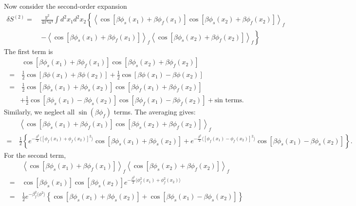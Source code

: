 \documentclass{SciPost}
\begin{document}
Now consider the second-order expansion
\begin{equation*}
\begin{aligned}
	\delta S^{(2)} 
	=&\ \frac{y^2}{4\pi^4 a^4} \int d^2 x_1 d^2 x_2 \left\{ \left\langle \cos\left[\beta\phi_s(x_1)+\beta\phi_f(x_1)\right] \cos\left[\beta\phi_s(x_2)+\beta\phi_f(x_2)\right] \right\rangle_f \right. \\
	&\ \left. -\left\langle \cos\left[\beta\phi_s(x_1)+\beta\phi_f(x_1)\right]\right\rangle_f \left\langle \cos\left[\beta\phi_s(x_2)+\beta\phi_f(x_2)\right]\right\rangle_f \right\}
\end{aligned}
\end{equation*}
The first term is 
\begin{equation*}
\begin{aligned}
	&\  \cos\left[\beta\phi_s(x_1)+\beta\phi_f(x_1)\right] 
		\cos\left[\beta\phi_s(x_2)+\beta\phi_f(x_2)\right] \\
	=&\ \frac{1}{2}\cos\left[\beta\phi(x_1)+\beta\phi(x_2)\right] + 
	  \frac{1}{2}\cos\left[\beta\phi(x_1)-\beta\phi(x_2)\right] \\
	=&\ \frac{1}{2}\cos\left[\beta\phi_s(x_1)+\beta\phi_s(x_2)\right] \cos\left[\beta\phi_f(x_1)+\beta\phi_f(x_2)\right] \\
	&+ \frac{1}{2} \cos\left[\beta\phi_s(x_1)-\beta\phi_s(x_2)\right] \cos\left[\beta\phi_f(x_1)-\beta\phi_f(x_2)\right]  + \text{sin terms}.
\end{aligned}
\end{equation*}
Similarly, we neglect all $\sin(\beta\phi_f)$ terms.
The averaging gives:
\begin{equation*}
\begin{aligned}
	&\  \left\langle\cos\left[\beta\phi_s(x_1)+\beta\phi_f(x_1)\right] 
		\cos\left[\beta\phi_s(x_2)+\beta\phi_f(x_2)\right]\right\rangle_f \\
	=&\ \frac{1}{2} \left\{e^{-\frac{\beta^2}{2}\langle[\phi_f(x_1)+\phi_f(x_2)]^2\rangle} \cos[\beta\phi_s(x_1)+\beta\phi_s(x_2)] + e^{-\frac{\beta^2}{2}\langle[\phi_f(x_1)-\phi_f(x_2)]^2\rangle} \cos[\beta\phi_s(x_1)-\beta\phi_s(x_2)] \right\}.
\end{aligned}
\end{equation*}
For the second term,
\begin{equation*}
\begin{aligned}
	&\ \left\langle \cos\left[\beta\phi_s(x_1)+\beta\phi_f(x_1)\right]\right\rangle_f \left\langle \cos\left[\beta\phi_s(x_2)+\beta\phi_f(x_2)\right]\right\rangle_f \\
	=&\ \cos[\beta\phi_s(x_1)]\cos[\beta\phi_s(x_2)] e^{-\frac{\beta^2}{2}\langle\phi_f^2(x_1)+\phi_f^2(x_2)\rangle} \\
	=&\ \frac{1}{2}e^{-\beta_f^2 \langle \phi^2\rangle} \left\{ \cos[\beta\phi_s(x_1)+\beta\phi_s(x_2)] + \cos[\beta\phi_s(x_1)-\beta\phi_s(x_2)] \right\}
\end{aligned}
\end{equation*}
\end{document}
